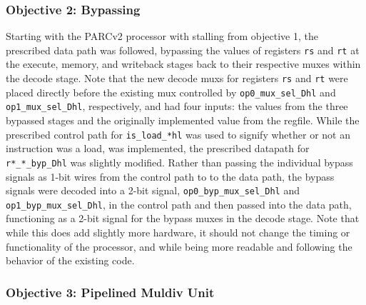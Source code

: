 \documentclass[12pt]{article}
\begin{document}
\subsubsection*{Objective 2: Bypassing}

Starting with the PARCv2 processor with stalling from objective 1,
the prescribed data path was followed, bypassing the values of
registers \texttt{rs} and \texttt{rt} at the execute, memory, and
writeback stages back to their respective muxes within the decode
stage. Note that the new decode muxs for registers \texttt{rs} and
\texttt{rt} were placed directly before the existing mux controlled
by \texttt{op0\_mux\_sel\_Dhl} and \texttt{op1\_mux\_sel\_Dhl},
respectively, and had four inputs: the values from the three bypassed
stages and the originally implemented value from the regfile. While
the prescribed control path for \texttt{is\_load\_*hl} was used to
signify whether or not an instruction was a load, was implemented,
the prescribed datapath for \texttt{r*\_*\_byp\_Dhl} was slightly
modified. Rather than passing the individual bypass signals as 1-bit
wires from the control path to to the data path, the bypass signals
were decoded into a 2-bit signal, \texttt{op0\_byp\_mux\_sel\_Dhl}
and \texttt{op1\_byp\_mux\_sel\_Dhl}, in the control path and then
passed into the data path, functioning as a 2-bit signal for the
bypass muxes in the decode stage. Note that while this does add
slightly more hardware, it should not change the timing or
functionality of the processor, and while being more readable and
following the behavior of the existing code.


\subsubsection*{Objective 3: Pipelined Muldiv Unit}
\end{document}
